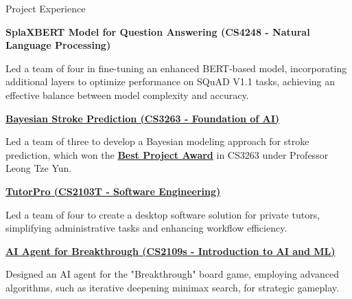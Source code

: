 \begin{rubric}{Project Experience}

\entry*[2024]
    \textbf{SplaXBERT Model for Question Answering (CS4248 - Natural Language Processing)}\par
    Led a team of four in fine-tuning an enhanced BERT-based model, incorporating additional layers to optimize performance on SQuAD V1.1 tasks, achieving an effective balance between model complexity and accuracy.

\entry*[2023]
    \textbf{\href{https://github.com/Yufannnn/Stroke-Prediction}{Bayesian Stroke Prediction (CS3263 - Foundation of AI)}}\par
    Led a team of three to develop a Bayesian modeling approach for stroke prediction, which won the \textbf{\href{https://github.com/Yufannnn/Stroke-Prediction/blob/main/docs/Zhu\%20Yufan\%20CS3263\%20Certificate\%20S1AY2324\%204.pdf}{Best Project Award}} in CS3263 under Professor Leong Tze Yun.


\entry*[2023]
    \textbf{\href{https://ay2223s2-cs2103t-w13-4.github.io/tp/}{TutorPro (CS2103T - Software Engineering)}}\par
    Led a team of four to create a desktop software solution for private tutors, simplifying administrative tasks and enhancing workflow efficiency.


\entry*[2022]
    \textbf{\href{https://github.com/Yufannnn/breakthrough-agent}{AI Agent for Breakthrough (CS2109s - Introduction to AI and ML)}}\par
    Designed an AI agent for the "Breakthrough" board game, employing advanced algorithms, such as iterative deepening minimax search, for strategic gameplay.



\end{rubric}

